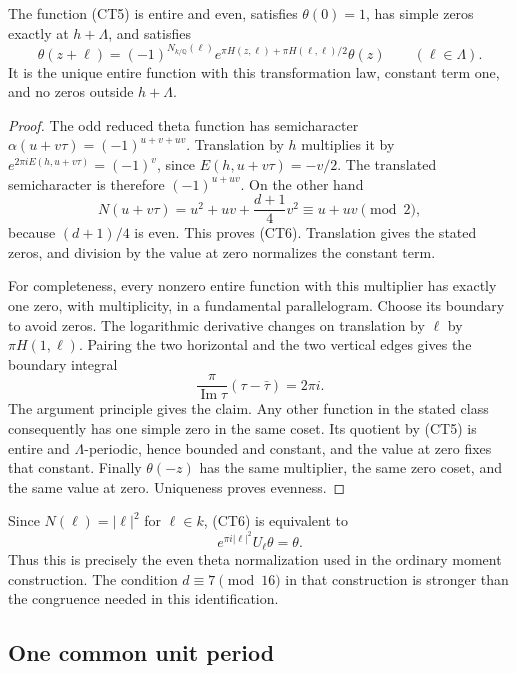 \begin{lemma}\label{ct-even-identification}
The function (CT5) is entire and even, satisfies $\theta(0)=1$,
has simple zeros exactly at $h+\Lambda$, and satisfies
\[
 \theta(z+\ell)=(-1)^{N_{k/\mathbb Q}(\ell)}
            e^{\pi H(z,\ell)+\pi H(\ell,\ell)/2}\theta(z)
                   \qquad(\ell\in\Lambda).
 \tag{CT6}
\]
It is the unique entire function with this transformation law,
constant term one, and no zeros outside $h+\Lambda$.
\end{lemma}
\begin{proof}
The odd reduced theta function has semicharacter
$\alpha(u+v\tau)=(-1)^{u+v+uv}$.
Translation by $h$ multiplies it by
$e^{2\pi iE(h,u+v\tau)}=(-1)^v$, since
$E(h,u+v\tau)=-v/2$.  The translated semicharacter is therefore
$(-1)^{u+uv}$.  On the other hand
\[
 N(u+v\tau)=u^2+uv+\frac{d+1}{4}v^2\equiv u+uv\pmod2,
\]
because $(d+1)/4$ is even.  This proves (CT6).
Translation gives the stated zeros, and division by the value at
zero normalizes the constant term.

For completeness, every nonzero entire function with this
multiplier has exactly one zero, with multiplicity, in a
fundamental parallelogram.  Choose its boundary to avoid zeros.
The logarithmic derivative changes on translation by $\ell$ by
$\pi H(1,\ell)$.  Pairing the two horizontal and the two
vertical edges gives the boundary integral
\[
       \frac{\pi}{\operatorname{Im}\tau}(\tau-\bar\tau)
                              =2\pi i.
\]
The argument principle gives the claim.  Any other function in
the stated class consequently has one simple zero in the same
coset.  Its quotient by (CT5) is entire and $\Lambda$-periodic,
hence bounded and constant, and the value at zero fixes that
constant.  Finally $\theta(-z)$ has the same multiplier, the same
zero coset, and the same value at zero.  Uniqueness proves
evenness.
\end{proof}

Since $N(\ell)=|\ell|^2$ for $\ell\in k$, (CT6) is equivalent
to
\[
               e^{\pi i|\ell|^2}U_\ell\theta=\theta.
 \tag{CT7}
\]
Thus this is precisely the even theta normalization used in the
ordinary moment construction.  The condition
$d\equiv7\pmod{16}$ in that construction is stronger than the
congruence needed in this identification.

\subsection{One common unit period}

